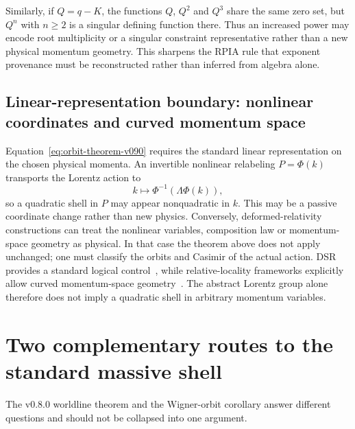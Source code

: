 \documentclass[11pt,a4paper]{article}
\begin{document}
Similarly, if $Q=q-K$, the functions $Q$, $Q^2$ and $Q^3$ share the same zero set, but $Q^n$ with $n\ge2$ is a singular defining function there.  Thus an increased power may encode root multiplicity or a singular constraint representative rather than a new physical momentum geometry.  This sharpens the RPIA rule that exponent provenance must be reconstructed rather than inferred from algebra alone.

\subsection{Linear-representation boundary: nonlinear coordinates and curved momentum space}
Equation~\eqref{eq:orbit-theorem-v090} requires the standard linear representation on the chosen physical momenta.  An invertible nonlinear relabeling $P=\Phi(k)$ transports the Lorentz action to
\begin{equation}
 k\longmapsto\Phi^{-1}(\Lambda\Phi(k)),
\end{equation}
so a quadratic shell in $P$ may appear nonquadratic in $k$.  This may be a passive coordinate change rather than new physics.  Conversely, deformed-relativity constructions can treat the nonlinear variables, composition law or momentum-space geometry as physical.  In that case the theorem above does not apply unchanged; one must classify the orbits and Casimir of the actual action.  DSR provides a standard logical control~\cite{magueijo2002}, while relative-locality frameworks explicitly allow curved momentum-space geometry~\cite{relativeLocality2011}.  The abstract Lorentz group alone therefore does not imply a quadratic shell in arbitrary momentum variables.

\section{Two complementary routes to the standard massive shell}
\label{sec:two-routes-v090}
The v0.8.0 worldline theorem and the Wigner-orbit corollary answer different questions and should not be collapsed into one argument.
\end{document}
